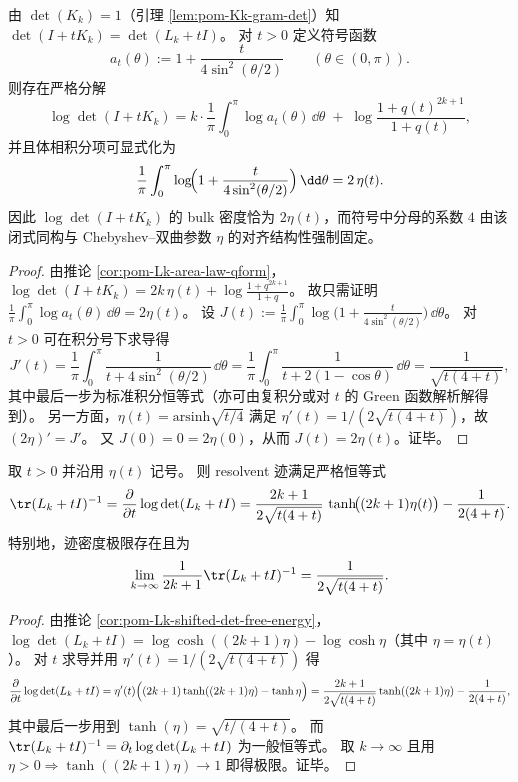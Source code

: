 \begin{proposition}[强 Szeg\H{o} 型分解的可积闭式：符号 \(a_t(\theta)=1+\frac{t}{4\sin^2(\theta/2)}\)]\label{prop:pom-Kk-strong-szego-bulk-surface}
由 \(\det(K_k)=1\)（引理 \ref{lem:pom-Kk-gram-det}）知 \(\det(I+tK_k)=\det(L_k+tI)\)。
对 \(t>0\) 定义符号函数
\[
a_t(\theta):=1+\frac{t}{4\sin^2(\theta/2)}\qquad(\theta\in(0,\pi)).
\]
则存在严格分解
\[
\log\det(I+tK_k)
=k\cdot \frac{1}{\pi}\int_{0}^{\pi}\log a_t(\theta)\,\dd\theta
\;+\;\log\frac{1+q(t)^{2k+1}}{1+q(t)},
\]
并且体相积分项可显式化为
\[
\frac{1}{\pi}\int_{0}^{\pi}\log\!\Bigl(1+\frac{t}{4\sin^2(\theta/2)}\Bigr)\,\dd\theta
=2\,\eta(t).
\]
因此 \(\log\det(I+tK_k)\) 的 bulk 密度恰为 \(2\eta(t)\)，而符号中分母的系数 \(4\) 由该闭式同构与 Chebyshev--双曲参数 \(\eta\) 的对齐结构性强制固定。
\end{proposition}
\begin{proof}
由推论 \ref{cor:pom-Lk-area-law-qform}，
\(
\log\det(I+tK_k)=2k\,\eta(t)+\log\frac{1+q^{2k+1}}{1+q}
\)。
故只需证明
\(
\frac{1}{\pi}\int_0^\pi \log a_t(\theta)\,\dd\theta=2\eta(t)
\)。
设
\(
J(t):=\frac{1}{\pi}\int_0^\pi \log\bigl(1+\frac{t}{4\sin^2(\theta/2)}\bigr)\,\dd\theta
\)。
对 \(t>0\) 可在积分号下求导得
\[
J'(t)=\frac{1}{\pi}\int_0^\pi \frac{1}{t+4\sin^2(\theta/2)}\,\dd\theta
=\frac{1}{\pi}\int_0^\pi \frac{1}{t+2(1-\cos\theta)}\,\dd\theta
=\frac{1}{\sqrt{t(4+t)}},
\]
其中最后一步为标准积分恒等式（亦可由复积分或对 \(t\) 的 Green 函数解析解得到）。
另一方面，\(\eta(t)=\mathrm{arsinh}\sqrt{t/4}\) 满足 \(\eta'(t)=1/(2\sqrt{t(4+t)})\)，故 \((2\eta)'=J'\)。
又 \(J(0)=0=2\eta(0)\)，从而 \(J(t)=2\eta(t)\)。证毕。
\end{proof}

\begin{corollary}\label{cor:pom-Lk-resolvent-trace-hyperbolic}
取 \(t>0\) 并沿用 \(\eta(t)\) 记号。
则 resolvent 迹满足严格恒等式
\[
\tr(L_k+tI)^{-1}
=\frac{\partial}{\partial t}\log\det(L_k+tI)
=\frac{2k+1}{2\sqrt{t(4+t)}}\,\tanh\!\bigl((2k+1)\eta(t)\bigr)-\frac{1}{2(4+t)}.
\]
特别地，迹密度极限存在且为
\[
\lim_{k\to\infty}\frac{1}{2k+1}\tr(L_k+tI)^{-1}
=\frac{1}{2\sqrt{t(4+t)}}.
\]
\end{corollary}
\begin{proof}
由推论 \ref{cor:pom-Lk-shifted-det-free-energy}，
\(
\log\det(L_k+tI)=\log\cosh((2k+1)\eta)-\log\cosh\eta
\)（其中 \(\eta=\eta(t)\)）。
对 \(t\) 求导并用 \(\eta'(t)=1/(2\sqrt{t(4+t)})\) 得
\[
\frac{\partial}{\partial t}\log\det(L_k+tI)
=\eta'(t)\Bigl((2k+1)\tanh((2k+1)\eta)-\tanh\eta\Bigr)
=\frac{2k+1}{2\sqrt{t(4+t)}}\tanh((2k+1)\eta)-\frac{1}{2(4+t)},
\]
其中最后一步用到 \(\tanh(\eta)=\sqrt{t/(4+t)}\)。
而 \(\tr(L_k+tI)^{-1}=\partial_t\log\det(L_k+tI)\) 为一般恒等式。
取 \(k\to\infty\) 且用 \(\eta>0\Rightarrow\tanh((2k+1)\eta)\to 1\) 即得极限。证毕。
\end{proof}

